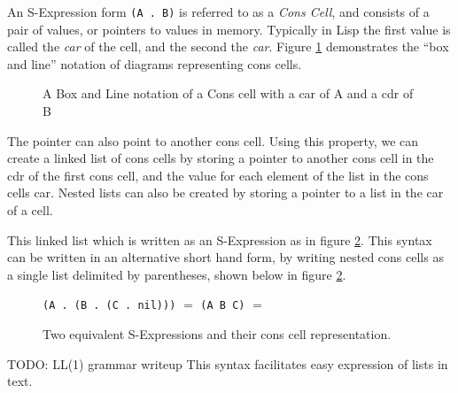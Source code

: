 \documentclass[11pt]{report}
\begin{document}
An S-Expression form \texttt{(A . B)} is referred to as a \textit{Cons Cell}, and consists of a pair of values, or pointers to values in memory. Typically in Lisp the first value is called the \textit{car} of the cell, and the second the \textit{car}. Figure \ref{fig:cons} demonstrates the ``box and line'' notation of diagrams representing cons cells.

\begin{figure}[h]
  \centering
  \caption{A Box and Line notation of a Cons cell with a car of A and a cdr of B}
  \label{fig:cons}
\end{figure}

The pointer can also point to another cons cell. Using this property, we can create a linked list of cons cells by storing a pointer to another cons cell in the cdr of the first cons cell, and the value for each element of the list in the cons cells car. Nested lists can also be created by storing a pointer to a list in the car of a cell.

This linked list which is written as an S-Expression as in figure \ref{fig:conslist}. This syntax can be written in an alternative short hand form, by writing nested cons cells as a single list delimited by parentheses, shown below in figure \ref{fig:conslist}.

\begin{figure}[h]
  \centering
  \texttt{(A . (B . (C . nil)))}
  $=$
  \texttt{(A B C)}
  $=$
  \caption{Two equivalent S-Expressions and their cons cell representation.}
  \label{fig:conslist}
\end{figure}

TODO: LL(1) grammar writeup
This syntax facilitates easy expression of lists in text.
\end{document}
